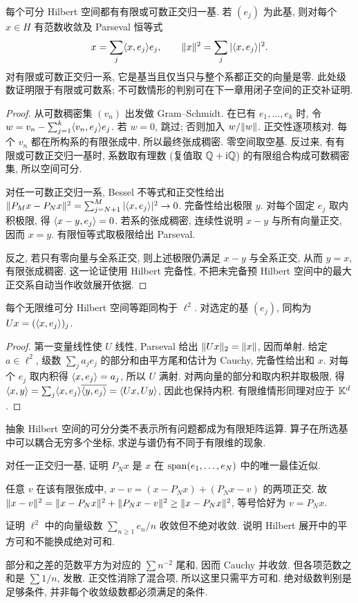 \begin{theorem}\label{thm:onb}
每个可分 Hilbert 空间都有有限或可数正交归一基. 若 $(e_j)$ 为此基, 则对每个 $x\in H$ 有范数收敛及 Parseval 恒等式
\[
x=\sum_j\langle x,e_j\rangle e_j,\qquad
\lVert x\rVert^2=\sum_j|\langle x,e_j\rangle|^2.
\]
对有限或可数正交归一系, 它是基当且仅当只与整个系都正交的向量是零. 此处级数证明限于有限或可数系; 不可数情形的判别可在下一章用闭子空间的正交补证明.
\end{theorem}
\begin{proof}
从可数稠密集 $(v_n)$ 出发做 Gram--Schmidt. 在已有 $e_1,\ldots,e_k$ 时, 令 $w=v_n-\sum_{j=1}^k\langle v_n,e_j\rangle e_j$. 若 $w=0$, 跳过; 否则加入 $w/\lVert w\rVert$. 正交性逐项核对. 每个 $v_n$ 都在所构系的有限张成中, 所以最终张成稠密. 零空间取空基. 反过来, 有有限或可数正交归一基时, 系数取有理数 (复值取 $\mathbb Q+\mathrm i\mathbb Q$) 的有限组合构成可数稠密集, 所以空间可分.

对任一可数正交归一系, Bessel 不等式和正交性给出
$\lVert P_Mx-P_Nx\rVert^2=\sum_{j=N+1}^M|\langle x,e_j\rangle|^2\to0$.
完备性给出极限 $y$. 对每个固定 $e_j$ 取内积极限, 得 $\langle x-y,e_j\rangle=0$. 若系的张成稠密, 连续性说明 $x-y$ 与所有向量正交, 因而 $x=y$. 有限恒等式取极限给出 Parseval.

反之, 若只有零向量与全系正交, 则上述极限仍满足 $x-y$ 与全系正交, 从而 $y=x$, 有限张成稠密. 这一论证使用 Hilbert 完备性, 不把未完备预 Hilbert 空间中的最大正交系自动当作收敛展开依据.
\end{proof}

\begin{theorem}\label{thm:hilbert-l2}
每个无限维可分 Hilbert 空间等距同构于 $\ell^2$. 对选定的基 $(e_j)$, 同构为 $Ux=(\langle x,e_j\rangle)_j$.
\end{theorem}
\begin{proof}
第一变量线性使 $U$ 线性, Parseval 给出 $\lVert Ux\rVert_2=\lVert x\rVert$, 因而单射. 给定 $a\in\ell^2$, 级数 $\sum_ja_je_j$ 的部分和由平方尾和估计为 Cauchy, 完备性给出和 $x$. 对每个 $e_j$ 取内积得 $\langle x,e_j\rangle=a_j$, 所以 $U$ 满射. 对两向量的部分和取内积并取极限, 得 $\langle x,y\rangle=\sum_j\langle x,e_j\rangle\overline{\langle y,e_j\rangle}=\langle Ux,Uy\rangle$, 因此也保持内积. 有限维情形同理对应于 $\mathbb K^d$.
\end{proof}
抽象 Hilbert 空间的可分分类不表示所有问题都成为有限矩阵运算. 算子在所选基中可以耦合无穷多个坐标, 求逆与谱仍有不同于有限维的现象.

\begin{exercise}\label{legacy:ch06:exercise1}
对任一正交归一基, 证明 $P_Nx$ 是 $x$ 在 $\operatorname{span}(e_1,\ldots,e_N)$ 中的唯一最佳近似.
\end{exercise}
\begin{solution}
任意 $v$ 在该有限张成中, $x-v=(x-P_Nx)+(P_Nx-v)$ 的两项正交. 故 $\lVert x-v\rVert^2=\lVert x-P_Nx\rVert^2+\lVert P_Nx-v\rVert^2\ge\lVert x-P_Nx\rVert^2$, 等号恰好为 $v=P_Nx$.
\end{solution}

\begin{exercise}\label{legacy:ch06:exercise2}
证明 $\ell^2$ 中的向量级数 $\sum_{n\ge1}e_n/n$ 收敛但不绝对收敛. 说明 Hilbert 展开中的平方可和不能换成绝对可和.
\end{exercise}
\begin{solution}
部分和之差的范数平方为对应的 $\sum n^{-2}$ 尾和, 因而 Cauchy 并收敛. 但各项范数之和是 $\sum1/n$, 发散. 正交性消除了混合项, 所以这里只需平方可和. 绝对级数判别是足够条件, 并非每个收敛级数都必须满足的条件.
\end{solution}
